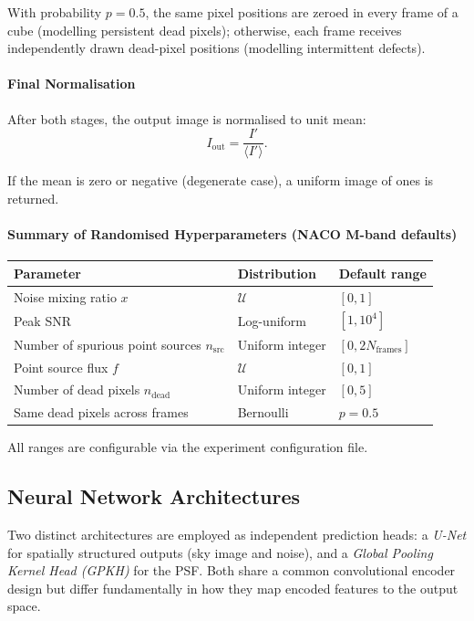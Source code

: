 \documentclass{aa}
\begin{document}
With probability $p = 0.5$, the same pixel positions are zeroed in every frame of a cube (modelling persistent dead pixels); otherwise, each frame receives independently drawn dead-pixel positions (modelling intermittent defects).

\paragraph{Final Normalisation}

After both stages, the output image is normalised to unit mean:
\begin{equation}
I_\mathrm{out} = \frac{I'}{\langle I' \rangle}.
\end{equation}

If the mean is zero or negative (degenerate case), a uniform image of ones is returned.

\paragraph{Summary of Randomised Hyperparameters (NACO M-band defaults)}

\begin{table}[h]
\centering
\begin{tabular}{|l|l|l|}
\hline
\textbf{Parameter} & \textbf{Distribution} & \textbf{Default range} \\
\hline
Noise mixing ratio $x$ & $\mathcal{U}$ & $[0, 1]$ \\
Peak SNR & Log-uniform & $[1, 10^4]$ \\
Number of spurious point sources $n_\mathrm{src}$ & Uniform integer & $[0, 2 N_\mathrm{frames}]$ \\
Point source flux $f$ & $\mathcal{U}$ & $[0, 1]$ \\
Number of dead pixels $n_\mathrm{dead}$ & Uniform integer & $[0, 5]$ \\
Same dead pixels across frames & Bernoulli & $p = 0.5$ \\
\hline
\end{tabular}
\end{table}

All ranges are configurable via the experiment configuration file.

\subsection{Neural Network Architectures}

Two distinct architectures are employed as independent prediction heads: a \emph{U-Net} for spatially structured outputs (sky image and noise), and a \emph{Global Pooling Kernel Head (GPKH)} for the PSF. Both share a common convolutional encoder design but differ fundamentally in how they map encoded features to the output space.
\end{document}
